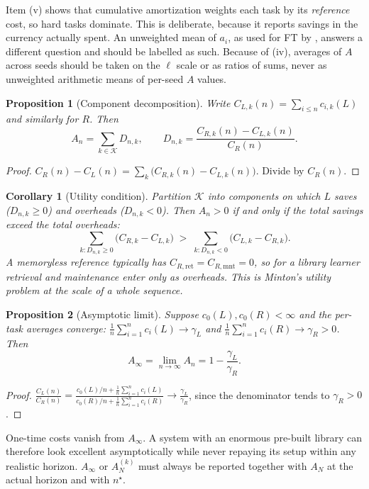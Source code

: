 \documentclass[11pt]{article}
\newtheorem{proposition}{Proposition}
\newtheorem{corollary}{Corollary}
\theoremstyle{remark}
\newcommand{\cK}{\mathcal{K}}
\begin{document}
Item (v) shows that cumulative amortization weights each task by its \emph{reference} cost, so hard tasks dominate.
This is deliberate, because it reports savings in the currency actually spent.
An unweighted mean of $a_i$, as used for FT by \citet{wolczyk2021continual}, answers a different question and should be labelled as such.
Because of (iv), averages of $A$ across seeds should be taken on the $\ell$ scale or as ratios of sums, never as unweighted arithmetic means of per-seed $A$ values.

\begin{proposition}[Component decomposition]\label{prop:decomp}
Write $C_{L,k}(n)=\sum_{i\le n}c_{i,k}(L)$ and similarly for $R$. Then
\begin{equation}\label{eq:decomp}
A_n = \sum_{k\in\cK} D_{n,k},\qquad D_{n,k} = \frac{C_{R,k}(n)-C_{L,k}(n)}{C_R(n)} .
\end{equation}
\end{proposition}
\begin{proof}
$C_R(n)-C_L(n) = \sum_k \bigl(C_{R,k}(n)-C_{L,k}(n)\bigr)$. Divide by $C_R(n)$.
\end{proof}

\begin{corollary}[Utility condition]\label{cor:utility}
Partition $\cK$ into components on which $L$ saves ($D_{n,k}\ge 0$) and overheads ($D_{n,k}<0$). Then $A_n>0$ if and only if the total savings exceed the total overheads:
\[
\sum_{k: D_{n,k}\ge 0}\bigl(C_{R,k}-C_{L,k}\bigr) \;>\; \sum_{k: D_{n,k}<0}\bigl(C_{L,k}-C_{R,k}\bigr).
\]
A memoryless reference typically has $C_{R,\mathrm{ret}}=C_{R,\mathrm{mnt}}=0$, so for a library learner retrieval and maintenance enter only as overheads. This is Minton's utility problem \citep{minton1990quantitative} at the scale of a whole sequence.
\end{corollary}

\begin{proposition}[Asymptotic limit]\label{prop:asym}
Suppose $c_0(L),c_0(R)<\infty$ and the per-task averages converge: $\frac1n\sum_{i=1}^n c_i(L)\to\gamma_L$ and $\frac1n\sum_{i=1}^n c_i(R)\to\gamma_R>0$. Then
\[
A_\infty = \lim_{n\to\infty}A_n = 1-\frac{\gamma_L}{\gamma_R}.
\]
\end{proposition}
\begin{proof}
$\frac{C_L(n)}{C_R(n)} = \frac{c_0(L)/n + \frac1n\sum_{i=1}^n c_i(L)}{c_0(R)/n+\frac1n\sum_{i=1}^n c_i(R)}\to\frac{\gamma_L}{\gamma_R}$, since the denominator tends to $\gamma_R>0$.
\end{proof}
One-time costs vanish from $A_\infty$. A system with an enormous pre-built library can therefore look excellent asymptotically while never repaying its setup within any realistic horizon.
$A_\infty$ or $A^{(k)}_N$ must always be reported together with $A_N$ at the actual horizon and with $n^\star$.
\end{document}
